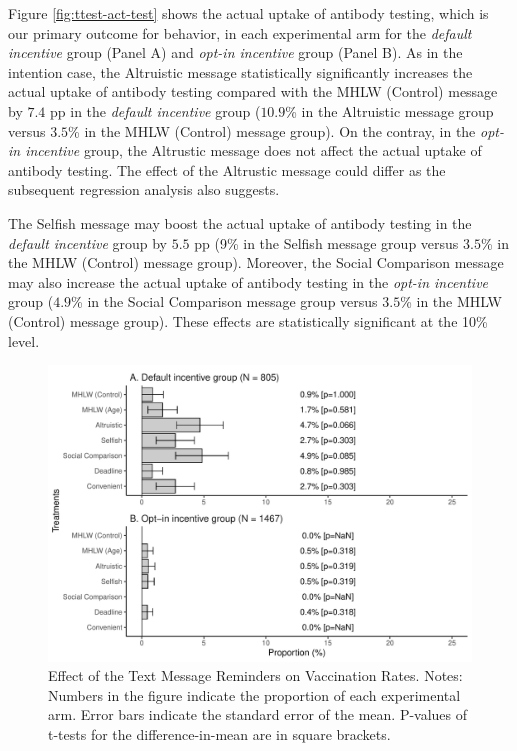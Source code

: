 \documentclass[
      12pt,
    a4paper
]{article}
\begin{document}
Figure \ref{fig:ttest-act-test} shows the actual uptake of antibody testing, which is our primary outcome for behavior, in each experimental arm for the \emph{default incentive} group (Panel A) and \emph{opt-in incentive} group (Panel B). As in the intention case, the Altruistic message statistically significantly increases the actual uptake of antibody testing compared with the MHLW (Control) message by \(7.4\) pp in the \emph{default incentive} group (\(10.9\)\% in the Altruistic message group versus \(3.5\)\% in the MHLW (Control) message group). On the contray, in the \emph{opt-in incentive} group, the Altrustic message does not affect the actual uptake of antibody testing. The effect of the Altrustic message could differ as the subsequent regression analysis also suggests.

The Selfish message may boost the actual uptake of antibody testing in the \emph{default incentive} group by \(5.5\) pp (9\% in the Selfish message group versus \(3.5\)\% in the MHLW (Control) message group). Moreover, the Social Comparison message may also increase the actual uptake of antibody testing in the \emph{opt-in incentive} group (\(4.9\)\% in the Social Comparison message group versus \(3.5\)\% in the MHLW (Control) message group). These effects are statistically significant at the 10\% level.

\begin{figure}[t]
\includegraphics{Main-Document-LaTeX_files/figure-latex/ttest-act-vacc-1} \caption{Effect of the Text Message Reminders on Vaccination Rates. Notes: Numbers in the figure indicate the proportion of each experimental arm. Error bars indicate the standard error of the mean. P-values of t-tests for the difference-in-mean are in square brackets.}\label{fig:ttest-act-vacc}
\end{figure}
\end{document}
